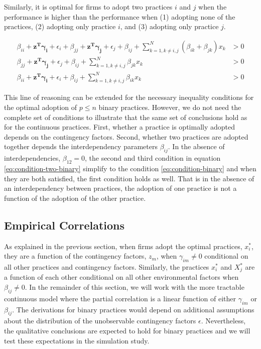\documentclass[12pt]{article}
\begin{document}
Similarly, it is optimal for firms to adopt two practices $i$ and $j$ when the performance is higher than the performance when (1) adopting none of the practices, (2) adopting only practice $i$, and (3) adopting only practice $j$. 

\begin{equation} \label{eq:condition-two-binary}
    \begin{aligned}
        \beta_{ii} + \mathbf{z^T} \mathbf{\gamma_i} + \epsilon_i
        + \beta_{jj} + \mathbf{z^T} \mathbf{\gamma_j} + \epsilon_j
        + \beta_{ij} + \sum^{N}_{k = 1, k \neq i,j} (\beta_{ik} + \beta_{jk}) x _k &> 0 \\
        \beta_{jj} + \mathbf{z^T} \mathbf{\gamma_j} + \epsilon_j 
        + \beta_{ij} + \sum^{N}_{k = 1, k \neq i,j} \beta_{jk} x_k &> 0 \\
        \beta_{ii} + \mathbf{z^T} \mathbf{\gamma_i} + \epsilon_i
        + \beta_{ij} + \sum^{N}_{k = 1, k \neq i,j} \beta_{ik} x_k &> 0 
    \end{aligned} 
\end{equation}

This line of reasoning can be extended for the necessary inequality conditions for the optimal adoption of $p \leq n$ binary practices. However, we do not need the complete set of conditions to illustrate that the same set of conclusions hold as for the continuous practices. First, whether a practice is optimally adopted depends on the contingency factors. Second, whether two practices are adopted together depends the interdependency parameters $\beta_{ij}$. In the absence of interdependencies, $\beta_{12} = 0$, the second and third condition in equation \eqref{eq:condition-two-binary} simplify to the condition \eqref{eq:condition-binary} and when they are both satisfied, the first condition holds as well. That is in the absence of an interdependency between practices, the adoption of one practice is not a function of the adoption of the other practice.

\subsection{Empirical Correlations}

As explained in the previous section, when firms adopt the optimal practices, $x^*_i$, they are a function of the contingency factors, $z_m$, when $\gamma_{im} \neq 0$ conditional on all other practices and contingency factors. Similarly, the practices $x^*_i$ and $X^*_j$ are a function of each other conditional on all other environmental factors when $\beta_{ij} \neq 0$. In the remainder of this section, we will work with the more tractable continuous model where the partial correlation is a linear function of either $\gamma_{im}$ or $\beta_{ij}$. The derivations for binary practices would depend on additional assumptions about the distribution of the unobservable contingency factors $\epsilon$. Nevertheless, the qualitative conclusions are expected to hold for binary practices and we will test these expectations in the simulation study.
\end{document}

